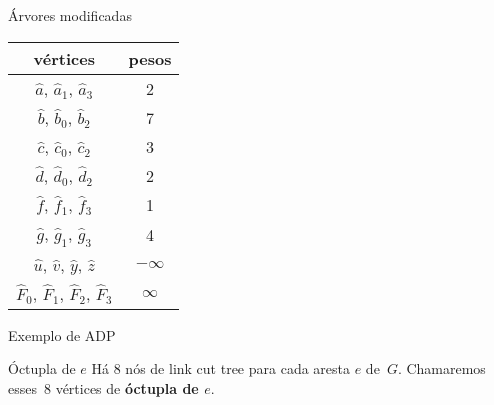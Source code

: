 \documentclass{IFES-beamer}
\newcommand{\defi}[1]{\textbf{#1}} %
\begin{document}
\begin{frame}{Árvores modificadas}
\begin{minipage}[H]{0.3\textwidth}
\centering
\begin{tabular}{| c  c |} 
 \hline
 vértices & pesos\\
 \hline
 $\hat a$, $\hat a_1$, $\hat a_3$ & 2 \\ 
 \hline
 $\hat b$, $\hat b_0$, $\hat b_2$ & 7 \\
 \hline
 $\hat c$, $\hat c_0$, $\hat c_2$ & 3 \\
 \hline
 $\hat d$, $\hat d_0$, $\hat d_2$ & 2 \\
 \hline
 $\hat f$, $\hat f_1$, $\hat f_3$ & 1 \\
 \hline
 $\hat g$, $\hat g_1$, $\hat g_3$ & 4 \\
 \hline
 $\hat u$, $\hat v$, $\hat y$, $\hat z$ & $-\infty$ \\
 \hline
 $\hat F_0$, $\hat F_1$, $\hat F_2$, $\hat F_3$ & $\infty$ \\
 \hline
\end{tabular}
\end{minipage}
\begin{minipage}[H]{0.5\textwidth}
    \centering
\scalebox{.7}{

}
\end{minipage}
\end{frame}

\begin{frame}{Exemplo de ADP}
\begin{figure}[htb]
\scalebox{.9}{
\centering

}
\label{fig:MSF-figura-4}
\end{figure}
\begin{block}{Óctupla de $e$}
Há $8$ nós de link cut tree para cada aresta $e$ de~$G$.
Chamaremos esses~$8$ vértices de \defi{óctupla de $e$}.
\end{block}
\end{frame}
\end{document}
